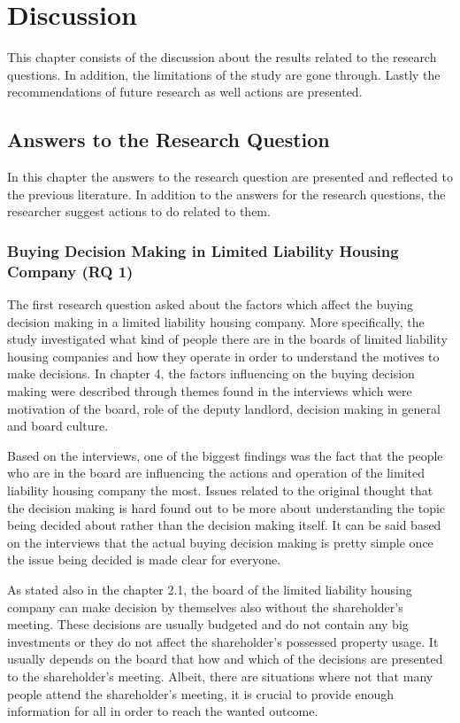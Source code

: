 \chapter{Discussion}
\label{chapter:discussion}

This chapter consists of the discussion about the results related to the research questions. In addition, the limitations of the study are gone through. Lastly the recommendations of future research as well actions are presented.

\section{Answers to the Research Question}

In this chapter the answers to the research question are presented and reflected to the previous literature. In addition to the answers for the research questions, the researcher suggest actions to do related to them.

\subsection{Buying Decision Making in Limited Liability Housing Company (RQ 1)}

The first research question asked about the factors which affect the buying decision making in a limited liability housing company. More specifically, the study investigated what kind of people there are in the boards of limited liability housing companies and how they operate in order to understand the motives to make decisions. In chapter 4, the factors influencing on the buying decision making were described through themes found in the interviews which were motivation of the board, role of the deputy landlord, decision making in general and board culture.

Based on the interviews, one of the biggest findings was the fact that the people who are in the board are influencing the actions and operation of the limited liability housing company the most. Issues related to the original thought that the decision making is hard found out to be more about understanding the topic being decided about rather than the decision making itself. It can be said based on the interviews that the actual buying decision making is pretty simple once the issue being decided is made clear for everyone.

As stated also in the chapter 2.1, the board of the limited liability housing company can make decision by themselves also without the shareholder's meeting. These decisions are usually budgeted and do not contain any big investments or they do not affect the shareholder's possessed property usage. It usually depends on the board that how and which of the decisions are presented to the shareholder's meeting. Albeit, there are situations where not that many people attend the shareholder's meeting, it is crucial to provide enough information for all in order to reach the wanted outcome.

